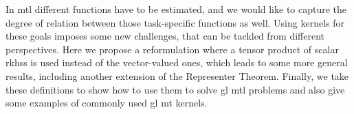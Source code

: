 In \acrshort{mtl} different functions have to be estimated, and we would like to capture the degree of relation between those task-specific functions as well. Using kernels for these goals imposes some new challenges, that can be tackled from different perspectives.
%
Here we propose a reformulation where a tensor product of scalar \acrshort{rkhss} is used instead of the vector-valued ones, which leads to some more general results, including another extension of the Representer Theorem.
%
Finally, we take these definitions to show how to use them to solve \acrshort{gl} \acrshort{mtl} problems and also give some examples of commonly used \acrshort{gl} \acrshort{mt} kernels.




